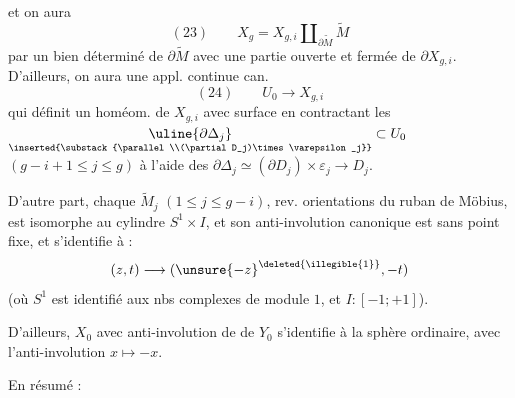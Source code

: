 
et on aura
\[
(23)\qquad X_g=X_{g,i}\amalg_{\partial\widetilde M}\widetilde M
\]
par un  bien déterminé de $\partial\widetilde M$ avec une partie ouverte et fermée de $\partial X_{g,i}$. D'ailleurs, on aura une appl. continue can.
\[
(24)\qquad U_0\longrightarrow X_{g,i}
\]
qui définit un homéom. de $X_{g,i}$ avec   surface  en contractant les $\underset{\inserted{\substack{\parallel\\(\partial D_j)\times\varepsilon_j}}}{\uline{\partial\Delta_j}}\subset U_0$ $(g-i+1\leq j\leq g)$ à l'aide des  $\partial\Delta_j\simeq(\partial D_j)\times\varepsilon_j\longrightarrow D_j$.

D'autre part, chaque $\widetilde M_j$ $(1\leq j\leq g-i)$, rev.  orientations du ruban de Möbius, est isomorphe au cylindre $S^1\times I$, et son anti-involution canonique  est sans point fixe, et s'identifie à :
\[
(z,t)\longrightarrow(\unsure{-z}^{\deleted{\illegible{1}}},-t)
\]
(où $S^1$ est identifié aux nbs complexes de module $1$, et $I:[-1;+1]$).

D'ailleurs, $X_0$  avec  anti-involution de  de $Y_0$ s'identifie à la sphère  ordinaire, avec l'anti-involution $x\longmapsto-x$.


En résumé :

